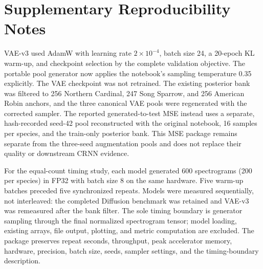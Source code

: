\documentclass{article}
\begin{document}
\clearpage
\appendix
\section{Supplementary Reproducibility Notes}

VAE-v3 used AdamW with learning rate $2\times10^{-4}$, batch size 24, a
20-epoch KL warm-up, and checkpoint selection by the complete validation
objective. The portable pool generator now applies the notebook's sampling
temperature 0.35 explicitly. The VAE checkpoint was not retrained. The
existing posterior bank was filtered to 256 Northern Cardinal, 247 Song
Sparrow, and 256 American Robin anchors, and the three canonical VAE pools
were regenerated with the corrected sampler.
The reported generated-to-test MSE instead uses a separate, hash-recorded
seed-42 pool reconstructed with the original notebook, 16 samples per species,
and the train-only posterior bank. This MSE package remains separate from the
three-seed augmentation pools and does not replace their quality or downstream
CRNN evidence.

For the equal-count timing study, each model generated 600 spectrograms
(200 per species) in FP32 with batch size 8 on the same hardware. Five warm-up
batches preceded five synchronized repeats. Models were measured sequentially,
not interleaved: the completed Diffusion benchmark was retained and VAE-v3 was
remeasured after the bank filter. The sole timing boundary is generator
sampling through the final normalized spectrogram tensor; model loading,
existing arrays, file output, plotting, and metric computation are excluded.
The package preserves repeat seconds, throughput, peak accelerator memory,
hardware, precision, batch size, seeds, sampler settings, and the
timing-boundary description.
\end{document}
